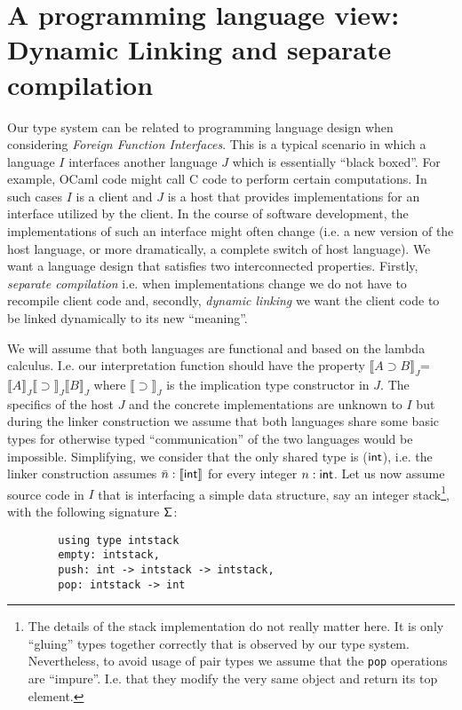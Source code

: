         \section{A programming language view: Dynamic Linking and separate compilation}
        \label{dlinker}
        Our type system can be related to programming language design when considering \textit{Foreign Function Interfaces}. This is a typical scenario in which a language $I$ interfaces another language $J$ which is  essentially ``black boxed''.
        For example, {\sf OCaml} code  might call {\sf C} code to perform certain computations. 
        In such cases $I$ is a client and $J$ is a host that provides implementations for an interface utilized by the client.
        In the course of software development, the implementations of such an interface might often change (i.e. a new version of the host language, or more dramatically, a complete switch of host language). 
        We want a language design that satisfies
        two  interconnected 
        properties. Firstly, \textit{separate compilation} i.e. when implementations change we do 
        not have to recompile client code and, 
        secondly, \textit{dynamic linking} we want the client code to be linked dynamically to its new 
        ``meaning''.
        
        We will assume that both languages are  functional and based on the lambda calculus. I.e. our interpretation function should have the property $\llbracket A\supset B\rrbracket_J$=
        $\llbracket A\rrbracket_J \llbracket\supset\rrbracket_J \llbracket B\rrbracket_J$ where  $\llbracket\supset\rrbracket_J$ is the implication type constructor in $J$.
        The specifics of the host  $J$ and the concrete implementations are unknown to $I$ but during the linker construction we assume that both languages share  some  basic types
        for otherwise  typed ``communication'' of the two languages would be impossible. 
        Simplifying,  we consider that the only  shared type is  (${\sf int}$), i.e. the linker construction assumes  
        $\bar{n}:\llbracket \sf int \rrbracket$ for every integer $n:{\sf int}$. 
        Let us now assume source code in $I$ that
        is  interfacing   a simple data structure, say an  integer stack\footnote{The details of the stack implementation do not really matter here. It is only ``gluing'' types together correctly that is observed by our type system. Nevertheless, to avoid usage of pair types we assume that the \texttt{pop} operations are ``impure''. I.e. that they modify the very same object and return its top element.},  
        with the following signature ${\sf \Sigma}$:
        \begin{lstlisting} 
        using type intstack
        empty: intstack, 
        push: int -> intstack -> intstack,
        pop: intstack -> int
        \end{lstlisting}
        
